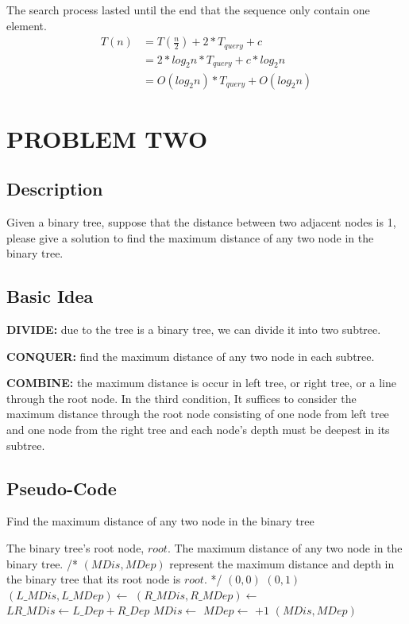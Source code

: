 \documentclass[UTF8,a4paper,12pt]{article}
\begin{document}
		The search process lasted until the end that the sequence only contain one element.
		\begin{align*}
			T(n) &= T(\frac{n}{2})+ 2*T_{query} +c\\
			& = 2*log_2{n}*T_{query} +c*log_2{n}\\
			& = O(log_2{n})*T_{query} +O(log_2{n})
		\end{align*}
	
	\newpage
	\section{PROBLEM TWO}
	\subsection{Description}
		Given a binary tree, suppose that the distance between two adjacent nodes is 1, please give a solution to find the maximum distance of any two node in the binary tree.
	\subsection{Basic Idea}
		\textbf{DIVIDE: }due to the tree is a binary tree, we can divide it into two subtree.
		
		\textbf{CONQUER: }find the maximum distance of any two node in each subtree.
		
		\textbf{COMBINE: }the maximum distance is occur in left tree, or right tree, or a line through the root node.  In the third condition, It suffices to consider the maximum distance through the root node consisting of one node from left tree and one node from the right tree and each node's depth must be deepest in its subtree. 
		
	\subsection{Pseudo-Code}
	\begin{algorithm}[htb]
		\caption{Find the maximum distance of any two node in the binary tree}
		\begin{algorithmic}[1]
			\Require
			The binary tree's root node, $ root $.
			\Ensure
			The maximum distance of any two node in the binary tree.
				\State /* $ (MDis,MDep) $ represent the maximum distance and depth in the binary tree that its root node is $ root $. */
					\State \Return $ (0,0) $
					\State \Return $ (0,1) $
				\EndIf
				\State $ (L\_MDis,L\_MDep) \gets $  
				\State $ (R\_MDis,R\_MDep) \gets $  
				\State $ LR\_MDis \gets L\_Dep + R\_Dep $
				\State $ MDis \gets $  
				\State $ MDep \gets $  $ + 1 $
				\State \Return $ (MDis,MDep) $
			\EndFunction
		\end{algorithmic}
	\end{algorithm}
	\newpage
\end{document}
